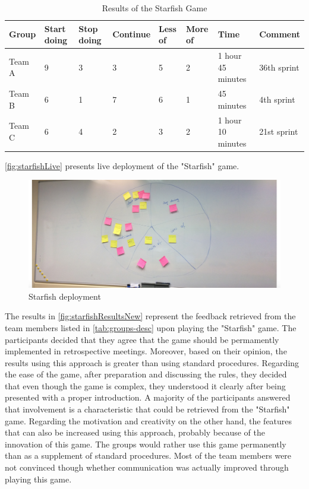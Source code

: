 \begin{table}[!htbp]
	\caption{Results of the Starfish Game}
	\label{tab:groups-starTeamResultsN}
	\begin{tabularx}{\textwidth}{|X|X|X|X|X|X|X|X|}
	\hline
		Group & Start doing & Stop doing & Continue & Less of &  More of & Time & Comment\\ \hline
		Team A & 9 & 3 & 3 & 5 & 2 & 1 hour 45 minutes & 36th sprint \\ \hline
		Team B & 6 & 1 & 7 & 6 & 1 & 45 minutes & 4th sprint\\ \hline
        Team C & 6 & 4 & 2 & 3 & 2 & 1 hour 10 minutes & 21st sprint\\ \hline
	\end{tabularx}
\end{table}

\autoref{fig:starfishLive} presents live deployment of the "Starfish" game.

\begin{figure}[!htbp]
\caption{Starfish deployment}
\label{fig:starfishLive}
\centering
\includegraphics[width=1\textwidth]{live/starfishLive}
\end{figure}


The results in \autoref{fig:starfishResultsNew} represent the feedback retrieved from the team members listed in \autoref{tab:groups-desc} upon playing the "Starfish" game. The participants decided that they agree that the game should be permamently implemented in retrospective meetings. Moreover, based on their opinion, the results using this approach is greater than using standard procedures. Regarding the ease of the game, after preparation and discussing the rules, they decided that even though the game is complex, they understood it clearly after being presented with a proper introduction. A majority of the participants answered that involvement is a characteristic that could be retrieved from the "Starfish" game. Regarding the motivation and creativity on the other hand, the features that can also be increased using this approach, probably because of the innovation of this game. The groups would rather use this game permanently than as a supplement of standard procedures. Most of the team members were not convinced though whether communication was actually improved through playing this game.

